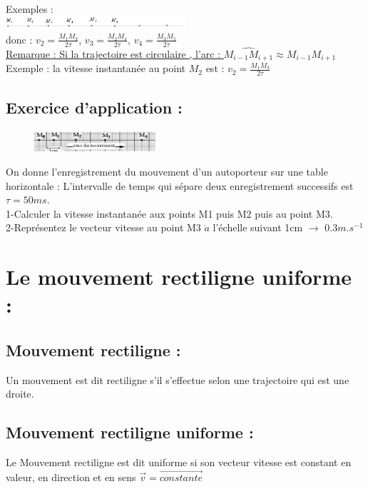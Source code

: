 \documentclass[12pt]{article}
\begin{document}
Exemples : 
\\\includegraphics[width=0.5\textwidth]{./img/img06.png}
\\donc :  $v_2 = \frac{M_1M_3}{2\tau}$, $v_3 = \frac{M_2M_4}{2\tau}$, $v_4 = \frac{M_3M_5}{2\tau}$
\\\underline{Remarque : Si la trajectoire est circulaire , l'arc : $\widehat{M_{i-1}M_{i+1}} \approx M_{i-1}M_{i+1}$}
\\Exemple : la vitesse instantanée au point $M_2$ est : $v_2 = \frac{M_1M_3}{2\tau}$

\subsection{Exercice d'application : }
\begin{figure}
\includegraphics[width=0.4\textwidth]{./img/img08.png}
\end{figure}
On donne l'enregistrement du mouvement d'un autoporteur sur une table horizontale :
L'intervalle de temps qui sépare deux enregistrement successifs est $\tau = 50ms$.
\\1-Calculer la vitesse instantanée aux points M1 puis M2 puis au point M3.
\\2-Représentez le vecteur vitesse au point M3 $\grave{a}$ l'échelle suivant 1cm $\rightarrow$ $0.3m.s^{-1}$




\section{Le mouvement rectiligne uniforme : }
\subsection{Mouvement rectiligne : }
Un mouvement est dit rectiligne s'il s'effectue selon une trajectoire qui est une droite.
\subsection{Mouvement rectiligne uniforme : }
Le Mouvement rectiligne est dit uniforme si son vecteur vitesse est constant en valeur, en direction et en sens $\vec{v} = \overrightarrow{constante}$
\end{document}
